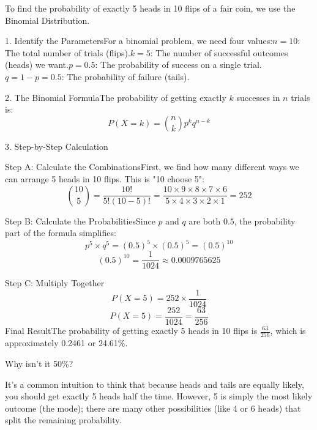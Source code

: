 \documentclass{report}
\begin{document}
\begin{sol}

    To find the probability of exactly 5 heads in 10 flips of a fair coin, we use the Binomial Distribution.
    
    1. Identify the ParametersFor a binomial problem, we need four values:$n = 10$: The total number of trials (flips).$k = 5$: The number of successful outcomes (heads) we want.$p = 0.5$: The probability of success on a single trial.$q = 1 - p = 0.5$: The probability of failure (tails).
    
    2. The Binomial FormulaThe probability of getting exactly $k$ successes in $n$ trials is:$$P(X = k) = \binom{n}{k} p^k q^{n-k}$$
    
    3. Step-by-Step Calculation

    Step A: Calculate the CombinationsFirst, we find how many different ways we can arrange 5 heads in 10 flips. This is "10 choose 5":$$\binom{10}{5} = \frac{10!}{5!(10-5)!} = \frac{10 \times 9 \times 8 \times 7 \times 6}{5 \times 4 \times 3 \times 2 \times 1} = 252$$
    
    Step B: Calculate the ProbabilitiesSince $p$ and $q$ are both $0.5$, the probability part of the formula simplifies:$$p^5 \times q^5 = (0.5)^5 \times (0.5)^5 = (0.5)^{10}$$$$(0.5)^{10} = \frac{1}{1024} \approx 0.0009765625$$
    
    Step C: Multiply Together$$P(X = 5) = 252 \times \frac{1}{1024}$$$$P(X = 5) = \frac{252}{1024} = \frac{63}{256}$$Final ResultThe probability of getting exactly 5 heads in 10 flips is $\frac{63}{256}$, which is approximately 0.2461 or 24.61\%.
    
    Why isn't it 50\%?
    
    It’s a common intuition to think that because heads and tails are equally likely, you should get exactly 5 heads half the time. However, 5 is simply the most likely outcome (the mode); there are many other possibilities (like 4 or 6 heads) that split the remaining probability.

\end{sol}

\end{document}
